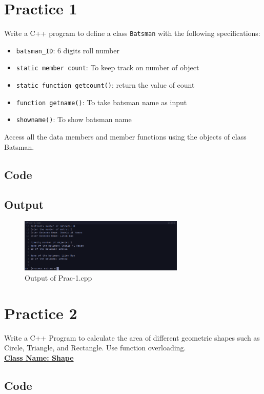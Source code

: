 \documentclass[12pt]{article}
\begin{document}
\section*{Practice 1}
Write a C++ program to define a class \texttt{Batsman} with the following specifications:
\begin{itemize}
    \item \texttt{batsman\_ID}: 6 digits roll number 
    \item \texttt{static member count}: To keep track on number of object 
    \item \texttt{static function getcount()}: return the value of count 
    \item \texttt{function getname()}: To take batsman name as input 
    \item \texttt{showname()}: To show batsman name
\end{itemize}
Access all the data members and member functions using the objects of class Batsman.

\subsection*{Code}


\subsection*{Output}
\begin{figure}[htpb]
    \centering
    \includegraphics[width=0.7\textwidth]{Prac-1.png}
    \caption{Output of Prac-1.cpp}
\end{figure}


\newpage
\section*{Practice 2}
Write a C++ Program to calculate the area of different geometric shapes such as Circle, Triangle, and Rectangle. Use function overloading. \\ 
\underline{\textbf{Class Name: Shape}}

\subsection*{Code}

\end{document}
